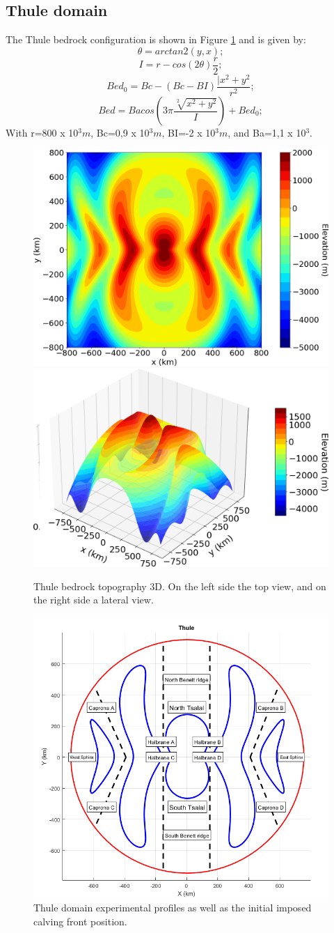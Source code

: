 \documentclass{article}
\begin{document}
\subsection{Thule domain}
The Thule bedrock configuration is shown in Figure \ref{Thule_3D} and is given by:
\begin{equation}
	\theta=arctan2(y,x);
\end{equation}
\begin{equation}
	I=r-cos(2\theta)\frac{r}{2};
\end{equation}
\begin{equation}
	Bed_0=Bc-(Bc-BI)\frac{|x^2+y^2}{r^2};
\end{equation}
\begin{equation}
	Bed=Bacos(3\pi\frac{\sqrt[2]{x^2+y^2}}{I})+Bed_0;
\end{equation}
With r=800 x 10$^3 m$, Bc=0,9 x 10$^3 m$, BI=-2 x 10$^3 m$, and Ba=1,1 x 10$^3$.
\begin{figure}[!h]
	\centering
	\includegraphics[width=0.45\linewidth]{../fig/Thule_2D}
	\includegraphics[width=0.45\linewidth]{../fig/Thule_3D}
	\caption{Thule bedrock topography 3D. On the left side the top view, and on the right side a lateral view.}
	\label{Thule_3D}
\end{figure}
\begin{figure}[!h]
	\centering
	\includegraphics[width=0.7\linewidth]{../fig/thule.png}
	\caption{Thule domain experimental profiles as well as the initial imposed calving front position.}
	\label{thule_profile}
\end{figure}
\end{document}
